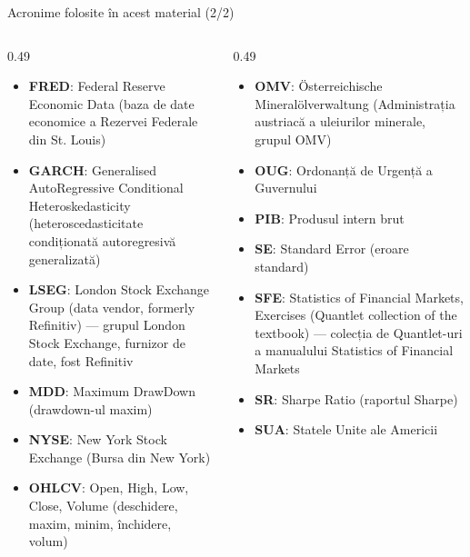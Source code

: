\begin{frame}{Acronime folosite în acest material (2/2)}
\begin{columns}[T]
\begin{column}{0.49\textwidth}
\begin{itemize}\setlength{\itemsep}{0pt}
    \item \textbf{FRED}: Federal Reserve Economic Data (baza de date economice a Rezervei Federale din St. Louis)
    \item \textbf{GARCH}: Generalised AutoRegressive Conditional Heteroskedasticity (heteroscedasticitate condiționată autoregresivă generalizată)
    \item \textbf{LSEG}: London Stock Exchange Group (data vendor, formerly Refinitiv) — grupul London Stock Exchange, furnizor de date, fost Refinitiv
    \item \textbf{MDD}: Maximum DrawDown (drawdown-ul maxim)
    \item \textbf{NYSE}: New York Stock Exchange (Bursa din New York)
    \item \textbf{OHLCV}: Open, High, Low, Close, Volume (deschidere, maxim, minim, închidere, volum)
\end{itemize}
\end{column}
\begin{column}{0.49\textwidth}
\begin{itemize}\setlength{\itemsep}{0pt}
    \item \textbf{OMV}: Österreichische Mineralölverwaltung (Administrația austriacă a uleiurilor minerale, grupul OMV)
    \item \textbf{OUG}: Ordonanță de Urgență a Guvernului
    \item \textbf{PIB}: Produsul intern brut
    \item \textbf{SE}: Standard Error (eroare standard)
    \item \textbf{SFE}: Statistics of Financial Markets, Exercises (Quantlet collection of the textbook) — colecția de Quantlet-uri a manualului Statistics of Financial Markets
    \item \textbf{SR}: Sharpe Ratio (raportul Sharpe)
    \item \textbf{SUA}: Statele Unite ale Americii
\end{itemize}
\end{column}
\end{columns}
\end{frame}

